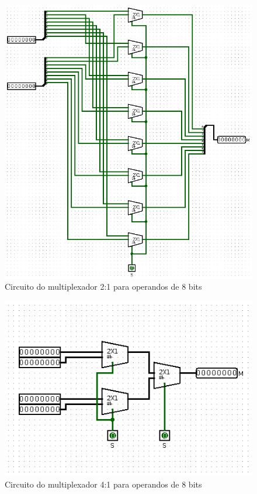 \documentclass[
	12pt,				%
	openright,			%
	twoside,			%
	a4paper,			%
	english,			%
	french,				%
	spanish,			%
	brazil,				%
	]{abntex2}
\begin{document}
\begin{figure}[H]
	\begin{center}
	    \includegraphics[scale=0.5]{imagens/mux218.png}
	\end{center}
\caption{\label{mux218}Circuito do multiplexador 2:1 para operandos de 8 bits}
\end{figure}

\begin{figure}[H]
	\begin{center}
	    \includegraphics[scale=0.6]{imagens/mux418.png}
	\end{center}
\caption{\label{mux418}Circuito do multiplexador 4:1 para operandos de 8 bits}
\end{figure}
\end{document}
